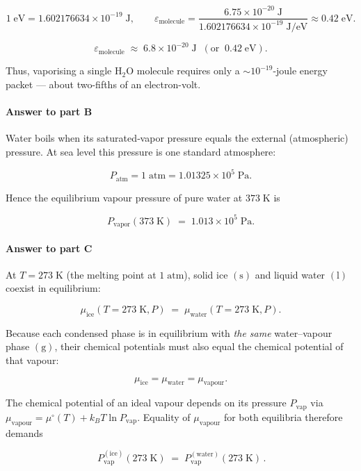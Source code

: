 \documentclass[12pt]{article}
\theoremstyle{definition} %
\theoremstyle{plain} %
\begin{document}
\[
  1\;\text{eV} = 1.602176634\times10^{-19}\;\text{J},
  \qquad
  \varepsilon_{\text{molecule}}
  = \frac{6.75\times10^{-20}\;\text{J}}{1.602176634\times10^{-19}\;\text{J/eV}}
  \approx 0.42\;\text{eV}.
\]

\[
  \boxed{
    \varepsilon_{\text{molecule}}
    \;\approx\;
    6.8\times10^{-20}\;\text{J}
    \;\;(\text{or}\;\;0.42\;\text{eV})
  }.
\]

Thus, vaporising a single \(\mathrm{H_2O}\) molecule requires only a
\(\sim\!\!10^{-19}\)-joule energy packet — about two-fifths of an
electron-volt.
\paragraph{Answer to part B}

Water boils when its saturated‐vapor pressure equals the external (atmospheric) pressure.  
At sea level this pressure is one standard atmosphere:

\[
  P_{\text{atm}}
  = 1\;\text{atm}
  = 1.01325\times10^{5}\;\text{Pa}.
\]

Hence the equilibrium vapour pressure of pure water at \(373\;\text{K}\) is

\[
  \boxed{P_{\text{vapor}}(373\;\text{K}) \;=\; 1.013\times10^{5}\;\text{Pa}}.
\]
\paragraph{Answer to part C}

At \(T = 273\;\text{K}\) (the melting point at \(1\;\text{atm}\)),  
solid ice \((\mathrm{s})\) and liquid water \((\mathrm{l})\) coexist in equilibrium:

\[
  \mu_{\mathrm{ice}}(T{=}273\;\text{K},P)
  \;=\;
  \mu_{\mathrm{water}}(T{=}273\;\text{K},P).
\]

Because each condensed phase is in equilibrium with \emph{the same} water–vapour phase \((\mathrm{g})\), their chemical potentials must also equal the chemical potential of that vapour:

\[
  \mu_{\mathrm{ice}} = \mu_{\mathrm{water}} = \mu_{\mathrm{vapour}} .
\]

The chemical potential of an ideal vapour depends on its pressure \(P_{\text{vap}}\) via  
\(\mu_{\mathrm{vapour}} = \mu^{\circ}(T) + k_B T \ln P_{\text{vap}}\).
Equality of \(\mu_{\mathrm{vapour}}\) for both equilibria therefore demands

\[
  \boxed{\,P_{\text{vap}}^{(\mathrm{ice})}(273\;\text{K})
         \;=\;
         P_{\text{vap}}^{(\mathrm{water})}(273\;\text{K})\,}.
\]
\end{document}
